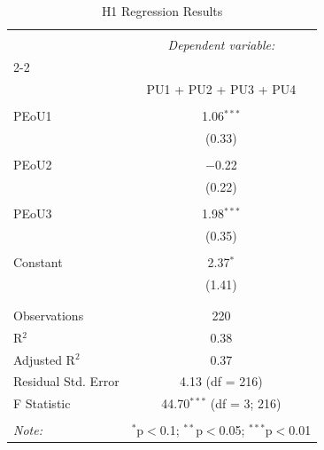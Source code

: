 
\begin{table}[!htbp] \centering 
  \caption{H1 Regression Results} 
  \label{} 
\begin{tabular}{@{\extracolsep{5pt}}lc} 
\\[-1.8ex]\hline 
\hline \\[-1.8ex] 
 & \multicolumn{1}{c}{\textit{Dependent variable:}} \\ 
\cline{2-2} 
\\[-1.8ex] & PU1 + PU2 + PU3 + PU4 \\ 
\hline \\[-1.8ex] 
 PEoU1 & 1.06$^{***}$ \\ 
  & (0.33) \\ 
  & \\ 
 PEoU2 & $-$0.22 \\ 
  & (0.22) \\ 
  & \\ 
 PEoU3 & 1.98$^{***}$ \\ 
  & (0.35) \\ 
  & \\ 
 Constant & 2.37$^{*}$ \\ 
  & (1.41) \\ 
  & \\ 
\hline \\[-1.8ex] 
Observations & 220 \\ 
R$^{2}$ & 0.38 \\ 
Adjusted R$^{2}$ & 0.37 \\ 
Residual Std. Error & 4.13 (df = 216) \\ 
F Statistic & 44.70$^{***}$ (df = 3; 216) \\ 
\hline 
\hline \\[-1.8ex] 
\textit{Note:}  & \multicolumn{1}{r}{$^{*}$p$<$0.1; $^{**}$p$<$0.05; $^{***}$p$<$0.01} \\ 
\end{tabular} 
\end{table} 
